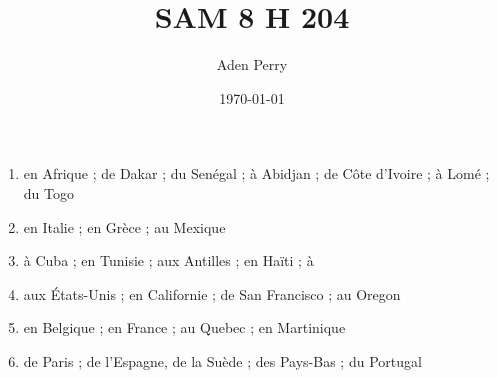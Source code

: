 \documentclass{article}
\title{SAM 8 H 204}
\author{Aden Perry}
\date{\today}
\begin{document}
\maketitle

\begin{enumerate}
    \item en Afrique ; de Dakar ; du Senégal ; à Abidjan ; de Côte d'Ivoire ; à Lomé ; du Togo
    \item en Italie ; en Grèce ; au Mexique
    \item à Cuba ; en Tunisie ; aux Antilles ; en Haïti ; à
    \item aux États-Unis ; en Californie ; de San Francisco ; au Oregon
    \item en Belgique ;  en France ; au Quebec ; en Martinique
    \item de Paris ; de l'Espagne, de la Suède ; des Pays-Bas ; du Portugal
\end{enumerate}
\end{document}
